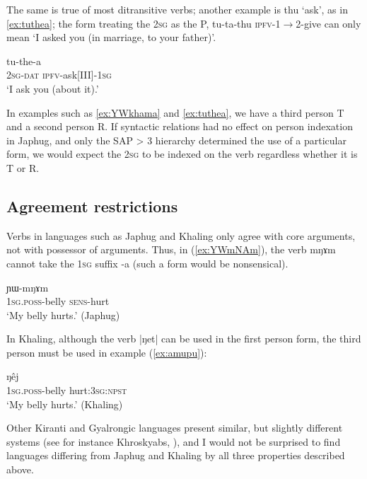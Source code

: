 \documentclass[oldfontcommands,oneside,a4paper,11pt]{article}
\newcommand{\ipa}[1]{{\phon \mbox{#1}}} %
\begin{document}
The same is true of most ditransitive verbs; another example is \ipa{thu} `ask', as in \ref{ex:tuthea}; the form treating the \textsc{2sg} as the P, \ipa{tu-ta-thu} \textsc{ipfv}-1$\rightarrow$2-give can only mean `I asked you (in marriage, to your father)'.

\begin{exe}
\ex \label{ex:tuthea}
\gll \ipa{nɤ-ɕki} 	\ipa{tu-the-a} \\
\textsc{2sg-dat} \textsc{ipfv}-ask[III]-\textsc{1sg} \\
\glt `I ask you (about it).'
\end{exe}

In examples such as \ref{ex:YWkhama} and \ref{ex:tuthea}, we have a third person T and a second person R. If syntactic relations had no effect on person indexation in Japhug, and only the SAP > 3 hierarchy determined the use of a particular form, we would expect the \textsc{2sg} to be indexed on the verb regardless whether it is T or R.

\subsection{Agreement restrictions}
Verbs in languages such as Japhug and Khaling only agree with core arguments, not with possessor of arguments. Thus, in (\ref{ex:YWmNAm}), the verb \ipa{mŋɤm} cannot take the \textsc{1sg} suffix \ipa{-a} (such a form would be nonsensical).

\begin{exe}
\ex \label{ex:YWmNAm}
\gll \ipa{a-xtu} 	\ipa{ɲɯ-mŋɤm} \\
\textsc{1sg.poss}-belly \textsc{sens}-hurt \\
\glt `My belly hurts.' (Japhug)
\end{exe}

In Khaling, although the verb \ipa{|ŋet|} can be used in the first person form, the third person must be used in example (\ref{ex:amupu}):

\begin{exe}
\ex \label{ex:amupu}
\gll \ipa{ʔʌ-mupu} 	\ipa{ŋêj} \\
\textsc{1sg.poss}-belly hurt:\textsc{3sg:npst} \\
\glt `My belly hurts.' (Khaling)
\end{exe}

Other Kiranti and Gyalrongic languages present similar, but slightly different systems (see for instance Khroskyabs, \citealt{lai15person}), and I would not be surprised to find languages differing from Japhug and Khaling by all three properties described above. 
\end{document}

